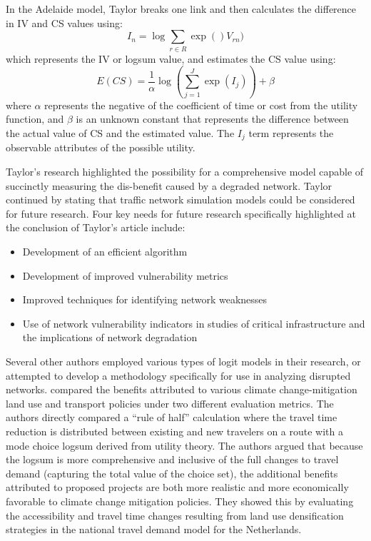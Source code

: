 In the Adelaide model, Taylor breaks one link and
then calculates the difference in IV and CS values using:
	\begin{equation}
		I_n=\log \sum_{r \in R} \exp(){V_{rn})}
	\end{equation}
which represents the IV or logsum value, and estimates the CS value using:
	\begin{equation}
		E(CS) = \frac{1}{\alpha} \log (\sum_{j = 1}^{J} \exp (I_j)) + \beta
			\label{eqn:taylor}
	\end{equation}
\noindent where \(\alpha\) represents the negative of the coefficient of time or cost from the utility function,
and \(\beta\) is an unknown constant that represents the difference between the actual value of CS and the estimated value.
The \(I_j\) term represents the observable attributes of the possible utility.

Taylor's research highlighted the possibility for a comprehensive model capable
of succinctly measuring the dis-benefit caused by a degraded network.
Taylor continued by stating that traffic network simulation models
could be considered for future research.  Four key needs for
future research specifically highlighted at the conclusion of Taylor's article include:

	\begin{itemize}
		\item {Development of an efficient algorithm}
		\item {Development of improved vulnerability metrics}
		\item {Improved techniques for identifying network weaknesses}
		\item {Use of network vulnerability indicators in studies of critical
		infrastructure and the implications of network degradation}
	\end{itemize}

Several other authors employed various types of logit models in their research,
or attempted to develop a methodology specifically for use in analyzing disrupted networks.
\citet{geurs2010} compared the benefits attributed to various climate
change-mitigation land use and transport policies under two different
evaluation metrics. The authors directly compared a “rule of half”
calculation where the travel time reduction is distributed between existing
and new travelers on a route with a mode choice logsum derived from utility
theory. The authors argued that because the logsum is more comprehensive and
inclusive of the full changes to travel demand (capturing the total value of
the choice set), the additional benefits attributed to proposed projects are
both more realistic and more economically favorable to climate change
mitigation policies. They showed this by evaluating the accessibility and
travel time changes resulting from land use densification strategies in the
national travel demand model for the Netherlands.

